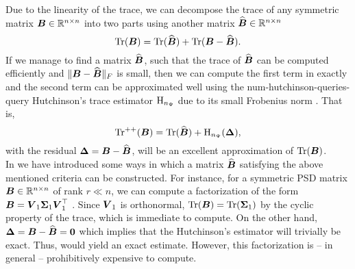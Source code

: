 Due to the linearity of the trace, we can decompose the trace of any symmetric
matrix $\boldsymbol{B} \in \mathbb{R}^{n \times n}$ into two parts using another matrix
$\widehat{\boldsymbol{B}} \in \mathbb{R}^{n \times n}$
\begin{equation}
    \operatorname{Tr}(\boldsymbol{B}) = \operatorname{Tr}(\widehat{\boldsymbol{B}}) + \operatorname{Tr}(\boldsymbol{B} - \widehat{\boldsymbol{B}}).
    \label{equ:4-nystromchebyshev-trace-decomposition}
\end{equation}
If we manage to find a matrix $\widehat{\boldsymbol{B}}$, such that the trace of
$\widehat{\boldsymbol{B}}$ can be computed efficiently and
$\lVert \boldsymbol{B} - \widehat{\boldsymbol{B}} \rVert _F$ is small,
then we can compute the first term in 
exactly and the second term can be approximated well using
the \gls{num-hutchinson-queries}-query Hutchinson's
trace estimator $\operatorname{H}_{n_{\Psi}}$ 
due to its small Frobenius norm .
That is,
\begin{equation}
    \operatorname{Tr}^{++}(\boldsymbol{B}) = \operatorname{Tr}(\widehat{\boldsymbol{B}}) + \operatorname{H}_{n_{\Psi}}(\boldsymbol{\Delta}),
    \label{equ:4-nystromchebyshev-hutch-pp}
\end{equation}
with the residual $\boldsymbol{\Delta} = \boldsymbol{B} - \widehat{\boldsymbol{B}}$, will be an excellent
approximation of $\operatorname{Tr}(\boldsymbol{B})$.\\

In  we have introduced
some ways in which a matrix $\widehat{\boldsymbol{B}}$ satisfying the above mentioned
criteria can be constructed. For instance, for a symmetric \gls{PSD} matrix $\boldsymbol{B} \in \mathbb{R}^{n \times n}$
of rank $r \ll n$, we can compute a factorization of the form
$\boldsymbol{B} = \boldsymbol{V}_1 \boldsymbol{\Sigma}_1 \boldsymbol{V}_1^{\top}$ .
Since $\boldsymbol{V}_1$ is orthonormal, $\operatorname{Tr}(\boldsymbol{B}) = \operatorname{Tr}(\boldsymbol{\Sigma}_1)$ by the
cyclic property of the trace, which is immediate to compute. On the other hand,
$\boldsymbol{\Delta} = \boldsymbol{B} - \widehat{\boldsymbol{B}} = \boldsymbol{0}$ which implies that the
Hutchinson's estimator will trivially be exact. Thus, 
would yield an exact estimate. However, this factorization is -- in general -- prohibitively expensive
to compute.\\

